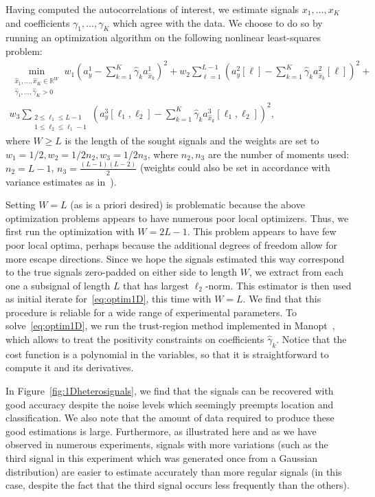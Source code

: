 \documentclass[12pt]{article}
\newcommand{\1}{\mathbf{1}}
\newcommand{\R}{\mathbb{R}}
\theoremstyle{plain}
\theoremstyle{definition}
\theoremstyle{remark}
\theoremstyle{plain}
\theoremstyle{remark}
\theoremstyle{plain}
\theoremstyle{plain}
\theoremstyle{plain}
\numberwithin{equation}{section}
\begin{document}
Having computed the autocorrelations of interest, we estimate signals $x_1, \ldots, x_K$ and coefficients $\gamma_1, \ldots, \gamma_K$ which agree with the data. We choose to do so by running an optimization algorithm on the following nonlinear least-squares problem:
\begin{multline}
	\min_{\substack{\hat x_1, \ldots, \hat x_K \in \R^{W} \\ \hat \gamma_1, \ldots, \hat \gamma_K > 0}} w_1 \left( a_y^1 - \sum_{k=1}^K \hat \gamma_k a_{\hat x_k}^1 \right)^2 + w_2 \sum_{\ell = 1}^{L-1} \left( a_y^2[\ell] - \sum_{k=1}^K \hat \gamma_k a_{\hat x_k}^2[\ell] \right)^2 + \\ w_3 \sum_{\substack{2\leq\ell_1\leq L-1 \\ 1 \leq \ell_2 \leq \ell_1-1}} \left( a_y^3[\ell_1, \ell_2] - \sum_{k=1}^K \hat \gamma_k a_{\hat x_k}^3[\ell_1,\ell_2] \right)^2,
	\label{eq:optim1D}
\end{multline}
where $W \geq L$ is the length of the sought signals and the weights are set to $w_1 = 1/2, w_2 = 1/2n_2, w_3 = 1/2n_3$, where $n_2, n_3$ are the number of moments used: $n_2 = L-1$, $n_3 = \frac{(L-1)(L-2)}{2}$ (weights could also be set in accordance with variance estimates as in~\cite{boumal2017heterogeneous}).

Setting $W = L$ (as is a priori desired) is problematic because the above optimization problems appears to have numerous poor local optimizers. Thus, we first run the optimization with $W = 2L-1$. This problem appears to have few poor local optima, perhaps because the additional degrees of freedom allow for more escape directions. Since we hope the signals estimated this way correspond to the true signals zero-padded on either side to length $W$, we extract from each one a subsignal of length $L$ that has largest $\ell_2$-norm. This estimator is then used as initial iterate for~\eqref{eq:optim1D}, this time with $W = L$. We find that this procedure is reliable for a wide range of experimental parameters. To solve~\eqref{eq:optim1D}, we run the trust-region method implemented in Manopt~\cite{manopt}, which allows to treat the positivity constraints on coefficients $\hat \gamma_k$. Notice that the cost function is a polynomial in the variables, so that it is straightforward to compute it and its derivatives.

In Figure~\ref{fig:1Dheterosignals}, we find that the signals can be recovered with good accuracy despite the noise levels which seemingly preempts location and classification. We also note that the amount of data required to produce these good estimations is large. Furthermore, as illustrated here and as we have observed in numerous experiments, signals with more variations (such as the third signal in this experiment which was generated once from a Gaussian distribution) are easier to estimate accurately than more regular signals (in this case, despite the fact that the third signal occurs less frequently than the others).
\end{document}
